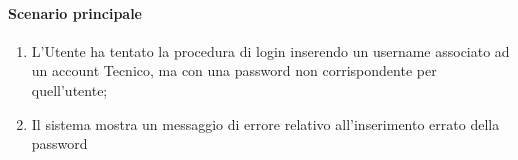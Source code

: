 \paragraph*{Scenario principale}
\begin{enumerate}
  \item L’Utente ha tentato la procedura di login inserendo un username associato ad un account Tecnico, ma con una password non corrispondente per quell'utente;
  \item Il sistema mostra un messaggio di errore relativo all'inserimento errato della password     
\end{enumerate}
